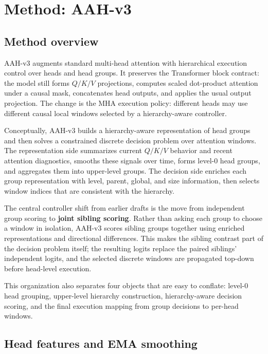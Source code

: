 \documentclass[11pt]{article}
\begin{document}
\section{Method: AAH-v3}

\subsection{Method overview}

AAH-v3 augments standard multi-head attention with hierarchical execution control over heads and head groups. It preserves the Transformer block contract: the model still forms \(Q/K/V\) projections, computes scaled dot-product attention under a causal mask, concatenates head outputs, and applies the usual output projection. The change is the MHA execution policy: different heads may use different causal local windows selected by a hierarchy-aware controller.

Conceptually, AAH-v3 builds a hierarchy-aware representation of head groups and then solves a constrained discrete decision problem over attention windows. The representation side summarizes current \(Q/K/V\) behavior and recent attention diagnostics, smooths these signals over time, forms level-0 head groups, and aggregates them into upper-level groups. The decision side enriches each group representation with level, parent, global, and size information, then selects window indices that are consistent with the hierarchy.

The central controller shift from earlier drafts is the move from independent group scoring to \textbf{joint sibling scoring}. Rather than asking each group to choose a window in isolation, AAH-v3 scores sibling groups together using enriched representations and directional differences. This makes the sibling contrast part of the decision problem itself; the resulting logits replace the paired siblings' independent logits, and the selected discrete windows are propagated top-down before head-level execution.

This organization also separates four objects that are easy to conflate: level-0 head grouping, upper-level hierarchy construction, hierarchy-aware decision scoring, and the final execution mapping from group decisions to per-head windows.

\subsection{Head features and EMA smoothing}
\end{document}
